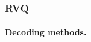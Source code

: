 \begin{frame}[plain]
\frametitle{RVQ}
\framesubtitle{Decoding methods.}
\logoCSIPCPL\mypagenum
\begin{changemargin}{-1.3in}{0in}
\begin{figure}[h]
\centering
{}				
\end{figure}
\end{changemargin}
\end{frame}


